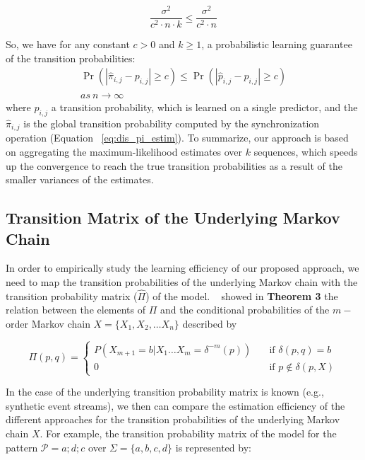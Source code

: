 \[ 
\frac{\sigma^{2}}{c^2 \cdot n \cdot k} \leq
\frac{\sigma^{2}}{c^2 \cdot n}
 \]

So, we have for any constant $c > 0$ and $k \ge 1$, a probabilistic learning guarantee of the transition probabilities: 
\begin{equation}
\begin{aligned}
 \Pr\left( |\hat{\pi}_{i,j} - {p}_{i,j}| \geq c \right) \leq
 \Pr\left( |\hat{p}_{i,j} - {p}_{i,j}| \geq c \right) \\
   as\ n \xrightarrow{} \infty
 \end{aligned}
 \end{equation}
 where $\hat{p}_{i,j}$ a transition probability, which is learned on a single \pmcmr predictor, and the $\hat{\pi}_{i,j}$ is the global transition probability computed by the synchronization operation (Equation ~\ref{eq:dis_pi_estim}). To summarize, our approach is based on aggregating the maximum-likelihood estimates over $k$ sequences, which speeds up the convergence to reach the true transition probabilities as a result of the smaller variances of the estimates.


 
\subsection{Transition Matrix of the Underlying Markov Chain}
\label{sec:underlaying_mc}
\par In order to empirically study the learning efficiency of our proposed approach, we need to map the transition probabilities of the underlying Markov chain with the transition probability matrix ($\hat{\Pi}$) of the \pmcmr model. ~\citet{nuel_pattern_2008} showed in \textbf{Theorem 3} the relation between the elements  of 
$\Pi$ and the conditional probabilities of the $m-$order Markov chain $X=\{X_1, X_2, \ldots X_n\}$ described by 

\[ \Pi(p, q) =
\begin{cases}
P(X_{m+1}=b|X_1\ldots X_m=\delta^{-m}(p))     & \quad \text{if } \delta(p,q)=b \\
0  & \quad \text{if } p \notin  \delta(p,X)
\end{cases}
\]
\par In the case of the underlying transition probability matrix is known (e.g., synthetic event streams), we then can compare the estimation efficiency of the different approaches for the transition probabilities of the underlying Markov chain $X$.  For example, the transition probability matrix of the \pmcmr model for the pattern $\mathcal{P}=a ; d ; c$ over  $\Sigma=\{a,b,c,d\}$ is represented by: 

